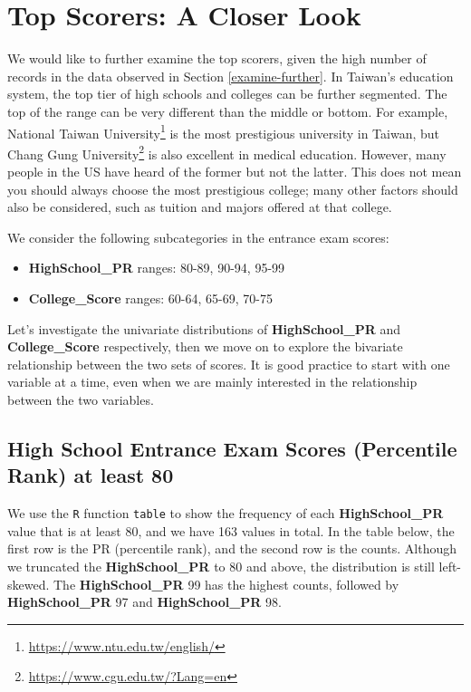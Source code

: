 \documentclass[
]{article}
\providecommand{\tightlist}{%
  \setlength{\itemsep}{0pt}\setlength{\parskip}{0pt}}
\begin{document}
\hypertarget{explore-top}{%
\section{Top Scorers: A Closer Look}\label{explore-top}}

We would like to further examine the top scorers, given the high number
of records in the data observed in Section \ref{examine-further}. In
Taiwan's education system, the top tier of high schools and colleges can
be further segmented. The top of the range can be very different than
the middle or bottom. For example, National Taiwan University\footnote{\url{https://www.ntu.edu.tw/english/}}
is the most prestigious university in Taiwan, but Chang Gung
University\footnote{\url{https://www.cgu.edu.tw/?Lang=en}} is also
excellent in medical education. However, many people in the US have
heard of the former but not the latter. This does not mean you should
always choose the most prestigious college; many other factors should
also be considered, such as tuition and majors offered at that college.

We consider the following subcategories in the entrance exam scores:

\begin{itemize}
\tightlist
\item
  \textbf{HighSchool\_PR} ranges: 80-89, 90-94, 95-99
\item
  \textbf{College\_Score} ranges: 60-64, 65-69, 70-75
\end{itemize}

Let's investigate the univariate distributions of
\textbf{HighSchool\_PR} and \textbf{College\_Score} respectively, then
we move on to explore the bivariate relationship between the two sets of
scores. It is good practice to start with one variable at a time, even
when we are mainly interested in the relationship between the two
variables.

\hypertarget{HighSchool-PR-80-up}{%
\subsection{High School Entrance Exam Scores (Percentile Rank) at least
80}\label{HighSchool-PR-80-up}}

We use the \texttt{R} function \texttt{table} to show the frequency of
each \textbf{HighSchool\_PR} value that is at least 80, and we have 163
values in total. In the table below, the first row is the PR (percentile
rank), and the second row is the counts. Although we truncated the
\textbf{HighSchool\_PR} to 80 and above, the distribution is still
left-skewed. The \textbf{HighSchool\_PR} 99 has the highest counts,
followed by \textbf{HighSchool\_PR} 97 and \textbf{HighSchool\_PR} 98.
\end{document}
